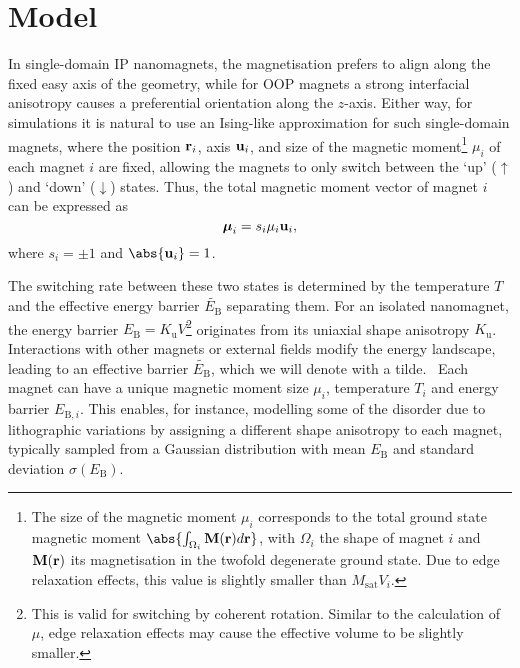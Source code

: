 \section{Model}
In single-domain IP nanomagnets, the magnetisation prefers to align along the fixed easy axis of the geometry, while for OOP magnets a strong interfacial anisotropy causes a preferential orientation along the $z$-axis.
Either way, for simulations it is natural to use an Ising-like approximation for such single-domain magnets, where the position $\boldsymbol{\mathbf{r}}_i$, axis $\boldsymbol{\mathbf{u}}_i$, and size of the magnetic moment\footnote{
	The size of the magnetic moment $\mu_i$ corresponds to the total ground state magnetic moment $\abs{\int_{\Omega_i} \vc{M}(\vc{r})d\vc{r}}$, with $\Omega_i$ the shape of magnet $i$ and $\boldsymbol{\mathbf{M}}(\boldsymbol{\mathbf{r}})$ its magnetisation in the twofold degenerate ground state. Due to edge relaxation effects, this value is slightly smaller than $M_\mathrm{sat} V_i$.
} $\mu_i$ of each magnet $i$ are fixed, allowing the magnets to only switch between the `up' ($\uparrow$) and `down' ($\downarrow$) states.
Thus, the total magnetic moment vector of magnet $i$ can be expressed as
\begin{equation}
	\boldsymbol{\mathbf{\mu}}_i = s_i \mu_i \boldsymbol{\mathbf{u}}_i \mathrm{,}
\end{equation}
where $s_i = \pm 1$ and $\abs{\vc{u}_i} = 1$. \par
The switching rate between these two states is determined by the temperature $T$ and the effective energy barrier $\widetilde{E_\mathrm{B}}$ separating them.
For an isolated nanomagnet, the energy barrier $E_\mathrm{B} = K_\mathrm{u} V$\footnote{
	This is valid for switching by coherent rotation. Similar to the calculation of $\mu$, edge relaxation effects may cause the effective volume to be slightly smaller.
} originates from its uniaxial shape anisotropy $K_\mathrm{u}$.
Interactions with other magnets or external fields modify the energy landscape, leading to an effective barrier $\widetilde{E_\mathrm{B}}$, which we will denote with a tilde.~\cite{leo2021chiral}
Each magnet can have a unique magnetic moment size $\mu_i$, temperature $T_i$ and energy barrier $E_{\mathrm{B},i}$.
This enables, for instance, modelling some of the disorder due to lithographic variations by assigning a different shape anisotropy to each magnet, typically sampled from a Gaussian distribution with mean $E_\mathrm{B}$ and standard deviation $\sigma(E_\mathrm{B})$. \\\par

